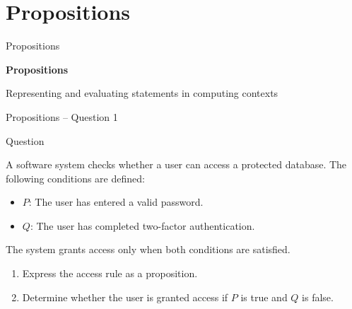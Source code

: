 \section{Propositions}


\begin{frame}{Propositions}

\begin{center}
\vspace{1cm}
{\Huge\textbf{Propositions}}

\vspace{0.6cm}

{\Large Representing and evaluating statements in computing contexts}

\end{center}

\end{frame}


\begin{frame}{Propositions -- Question 1}

\begin{block}{Question}

A software system checks whether a user can access a protected
database. The following conditions are defined:

\begin{itemize}
\item $P$: The user has entered a valid password.
\item $Q$: The user has completed two-factor authentication.
\end{itemize}

The system grants access only when both conditions are satisfied.

\medskip

\begin{enumerate}
\item Express the access rule as a proposition.
\item Determine whether the user is granted access if
$P$ is true and $Q$ is false.
\end{enumerate}

\end{block}

\end{frame}

